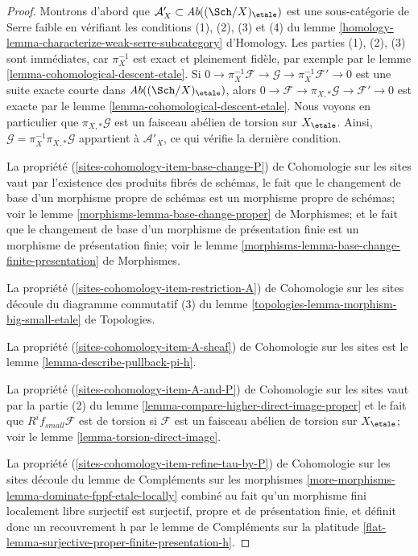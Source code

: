 \begin{proof}
Montrons d'abord que $\mathcal{A}'_X \subset \textit{Ab}((\Sch/X)_\etale)$
est une sous-catégorie de Serre faible en vérifiant les conditions (1), (2), (3) et (4)
du lemme \ref{homology-lemma-characterize-weak-serre-subcategory} d'Homology.
Les parties (1), (2), (3) sont immédiates, car $\pi_X^{-1}$ est exact et
pleinement fidèle, par exemple par le lemme \ref{lemma-cohomological-descent-etale}. Si
$0 \to \pi_X^{-1}\mathcal{F} \to \mathcal{G} \to \pi_X^{-1}\mathcal{F}' \to 0$
est une suite exacte courte dans $\textit{Ab}((\Sch/X)_\etale)$,
alors $0 \to \mathcal{F} \to \pi_{X, *}\mathcal{G} \to \mathcal{F}' \to 0$
est exacte par le lemme \ref{lemma-cohomological-descent-etale}.
Nous voyons en particulier que $\pi_{X, *}\mathcal{G}$ est un faisceau
abélien de torsion sur $X_\etale$.
Ainsi, $\mathcal{G} = \pi_X^{-1}\pi_{X, *}\mathcal{G}$ appartient à
$\mathcal{A}'_X$, ce qui vérifie la dernière condition.

\medskip\noindent
La propriété (\ref{sites-cohomology-item-base-change-P}) de Cohomologie sur les sites vaut
par l'existence des produits fibrés de schémas,
le fait que le changement de base d'un morphisme propre de
schémas est un morphisme propre de schémas; voir le
lemme \ref{morphisms-lemma-base-change-proper} de Morphismes; et
le fait que le changement de base d'un morphisme de présentation finie
est un morphisme de présentation finie; voir le
lemme \ref{morphisms-lemma-base-change-finite-presentation} de Morphismes.

\medskip\noindent
La propriété (\ref{sites-cohomology-item-restriction-A}) de Cohomologie sur les sites
découle du diagramme commutatif (3) du
lemme \ref{topologies-lemma-morphism-big-small-etale} de Topologies.

\medskip\noindent
La propriété (\ref{sites-cohomology-item-A-sheaf}) de Cohomologie sur les sites est le
lemme \ref{lemma-describe-pullback-pi-h}.

\medskip\noindent
La propriété (\ref{sites-cohomology-item-A-and-P}) de Cohomologie sur les sites vaut par la
partie (2) du lemme \ref{lemma-compare-higher-direct-image-proper}
et le fait que $R^if_{small}\mathcal{F}$
est de torsion si $\mathcal{F}$ est un faisceau
abélien de torsion sur $X_\etale$; voir le lemme \ref{lemma-torsion-direct-image}.

\medskip\noindent
La propriété (\ref{sites-cohomology-item-refine-tau-by-P}) de Cohomologie sur les sites
découle du lemme de Compléments sur les morphismes
\ref{more-morphisms-lemma-dominate-fppf-etale-locally}
combiné au fait qu'un morphisme fini localement libre surjectif
est surjectif, propre et de présentation finie, et définit donc
un recouvrement h par le lemme de Compléments sur la platitude
\ref{flat-lemma-surjective-proper-finite-presentation-h}.
\end{proof}

